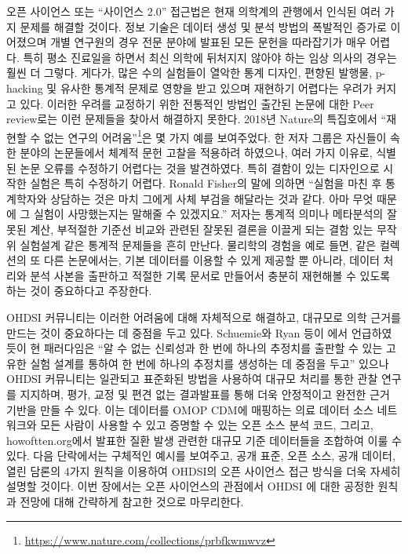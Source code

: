 \documentclass[11pt]{book}
\let\rmarkdownfootnote\footnote%
\def\footnote{\protect\rmarkdownfootnote}
\theoremstyle{definition}
\theoremstyle{definition}
\theoremstyle{definition}
\theoremstyle{remark}
\begin{document}
오픈 사이언스 또는 ``사이언스 2.0'' \citep{wiki:Science_2.0} 접근법은
현재 의학계의 관행에서 인식된 여러 가지 문제를 해결할 것이다. 정보
기술은 데이터 생성 및 분석 방법의 폭발적인 증가로 이어졌으며 개별
연구원의 경우 전문 분야에 발표된 모든 문헌을 따라잡기가 매우 어렵다.
특히 평소 진료일을 하면서 최신 의학에 뒤처지지 않아야 하는 임상 의사의
경우는 훨씬 더 그렇다. 게다가, 많은 수의 실험들이 열악한 통계 디자인,
편향된 발행물, p-hacking 및 유사한 통계적 문제로 영향을 받고 있으며
재현하기 어렵다는 우려가 커지고 있다. 이러한 우려를 교정하기 위한
전통적인 방법인 출간된 논문에 대한 Peer review로는 이런 문제들을 찾아서
해결하지 못한다. 2018년 Nature의 특집호에서 ``재현할 수 없는 연구의
어려움''\footnote{\url{https://www.nature.com/collections/prbfkwmwvz}}은
몇 가지 예를 보여주었다. 한 저자 그룹은 자신들이 속한 분야의 논문들에서
체계적 문헌 고찰을 적용하려 하였으나, 여러 가지 이유로, 식별된 논문
오류를 수정하기 어렵다는 것을 발견하였다. 특히 결함이 있는 디자인으로
시작한 실험은 특히 수정하기 어렵다. Ronald Fisher의 말에 의하면 ``실험을
마친 후 통계학자와 상담하는 것은 마치 그에게 사체 부검을 해달라는 것과
같다. 아마 무엇 때문에 그 실험이 사망했는지는 말해줄 수 있겠지요.''
\citep{wikiquote:Ronald_Fisher} 저자는 통계적 의미나 메타분석의 잘못된
계산, 부적절한 기준선 비교와 관련된 잘못된 결론을 이끌게 되는 결함 있는
무작위 실험설계 같은 통계적 문제들을 흔히 만난다. \citep{allison_2016}
물리학의 경험을 예로 들면, 같은 컬렉션의 또 다른 논문에서는, 기본
데이터를 이용할 수 있게 제공할 뿐 아니라, 데이터 처리와 분석 사본을
출판하고 적절한 기록 문서로 만들어서 충분히 재현해볼 수 있도록 하는 것이
중요하다고 주장한다. \citep{Chen2018}

OHDSI 커뮤니티는 이러한 어려움에 대해 자체적으로 해결하고, 대규모로 의학
근거를 만드는 것이 중요하다는 데 중점을 두고 있다. Schuemie와 Ryan 등이
\citet{schuemie_2018b} 에서 언급하였듯이 현 패러다임은 ``알 수 없는
신뢰성과 한 번에 하나의 추정치를 출판할 수 있는 고유한 실험 설계를
통하여 한 번에 하나의 추정치를 생성하는 데 중점을 두고'' 있으나 OHDSI
커뮤니티는 일관되고 표준화된 방법을 사용하여 대규모 처리를 통한 관찰
연구를 지지하며, 평가, 교정 및 편견 없는 결과발표를 통해 더욱 안정적이고
완전한 근거 기반을 만들 수 있다. 이는 데이터를 OMOP CDM에 매핑하는 의료
데이터 소스 네트워크와 모든 사람이 사용할 수 있고 증명할 수 있는 오픈
소스 분석 코드, 그리고, howoftten.org에서 발표한 질환 발생 관련한 대규모
기준 데이터들을 조합하여 이룰 수 있다. 다음 단락에서는 구체적인 예시를
보여주고, 공개 표준, 오픈 소스, 공개 데이터, 열린 담론의 4가지 원칙을
이용하여 OHDSI의 오픈 사이언스 접근 방식을 더욱 자세히 설명할 것이다.
이번 장에서는 오픈 사이언스의 관점에서 OHDSI 에 대한 공정한 원칙과
전망에 대해 간략하게 참고한 것으로 마무리한다.
\end{document}

